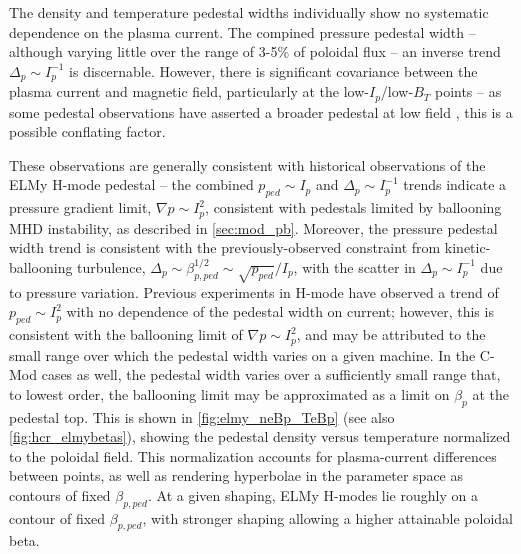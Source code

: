 The density and temperature pedestal widths individually show no systematic dependence on the plasma current.  The compined pressure pedestal width -- although varying little over the range of 3-5\% of poloidal flux -- an inverse trend $\Delta_p \sim I_p^{-1}$ is discernable.  However, there is significant covariance between the plasma current and magnetic field, particularly at the low-$I_p$/low-$B_T$ points -- as some pedestal observations have asserted a broader pedestal at low field \cite{Hughes2002}, this is a possible conflating factor.

These observations are generally consistent with historical observations of the ELMy H-mode pedestal -- the combined $p_{ped} \sim I_p$ and $\Delta_p \sim I_p^{-1}$ trends indicate a pressure gradient limit, $\nabla p \sim I_p^2$, consistent with pedestals limited by ballooning MHD instability, as described in \cref{sec:mod_pb}.  Moreover, the pressure pedestal width trend is consistent with the previously-observed constraint from kinetic-ballooning turbulence, $\Delta_p \sim \beta_{p,ped}^{1/2} \sim \sqrt{p_{ped}}/I_p$, with the scatter in $\Delta_p \sim I_p^{-1}$ due to pressure variation.  Previous experiments in H-mode have observed a trend of $p_{ped} \sim I_p^2$ with no dependence of the pedestal width on current; however, this is consistent with the ballooning limit of $\nabla p \sim I_p^2$, and may be attributed to the small range over which the pedestal width varies on a given machine.  In the C-Mod cases as well, the pedestal width varies over a sufficiently small range that, to 
lowest order, the ballooning limit may be approximated as a limit on $\beta_{p}$ at the pedestal top.  This is shown in \cref{fig:elmy_neBp_TeBp} (see also \cref{fig:hcr_elmybetas}), showing the pedestal density versus temperature normalized to the poloidal field.  This normalization accounts for plasma-current differences between points, as well as rendering hyperbolae in the parameter space as contours of fixed $\beta_{p,ped}$.  At a given shaping, ELMy H-modes lie roughly on a contour of fixed $\beta_{p,ped}$, with stronger shaping allowing a higher attainable poloidal beta.

